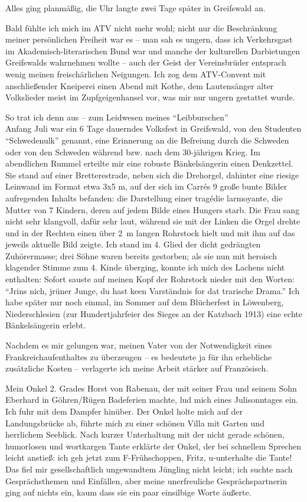 Alles ging planmäßig, die Uhr langte zwei Tage später in Greifswald an.

Bald fühlte ich mich im ATV nicht mehr wohl; nicht nur die Beschränkung meiner persönlichen Freiheit war es -- man sah es ungern, dass ich Verkehrsgast im Akademisch-literarischen Bund war und manche der kulturellen Darbietungen Greifswalds wahrnehmen wollte -- auch der Geist der Vereinsbrüder entsprach wenig meinen freischärlichen Neigungen. Ich zog dem ATV-Convent mit anschließender Kneiperei einen Abend mit Kothe, dem Lautensänger alter Volkslieder meist im Zupfgeigenhansel vor, was mir nur ungern gestattet wurde.

So trat ich denn aus -- zum Leidwesen meines \enquote{Leibburschen}\\

Anfang Juli war ein 6 Tage dauerndes Volksfest in Greifswald, von den Studenten \enquote{Schwedenulk} genannt, eine Erinnerung an die Befreiung durch die Schweden oder von den Schweden während bzw. nach dem 30-jährigen Krieg. Im abendlichen Rummel erteilte mir eine robuste Bänkelsängerin einen Denkzettel. Sie stand auf einer Bretterestrade, neben sich die Drehorgel, dahinter eine riesige Leinwand im Format etwa 3x5 m, auf der sich im Carrés 9 große bunte Bilder aufregenden Inhalts befanden: die Darstellung einer tragédie larmoyante, die Mutter von 7 Kindern, deren auf jedem Bilde eines Hungers starb. Die Frau sang nicht sehr klangvoll, dafür sehr laut, während sie mit der Linken die Orgel drehte und in der Rechten einen über 2~m langen Rohrstock hielt und mit ihm auf das jeweils aktuelle Bild zeigte. Ich stand im 4. Glied der dicht gedrängten Zuhörermasse; drei Söhne waren bereits gestorben; als sie nun mit heroisch klagender Stimme zum 4. Kinde überging, konnte ich mich des Lachens nicht enthalten: Sofort sauste auf meinen Kopf der Rohrstock nieder mit den Worten: \enquote{Jrins nich, jrüner Junge, du hast keen Varständnis for dat trarische Drama.}
Ich habe später nur noch einmal, im Sommer auf dem Blücherfest in Löwenberg, Niederschlesien (zur Hundertjahrfeier des Sieges an der Katzbach 1913) eine echte Bänkelsängerin erlebt.

Nachdem es mir gelungen war, meinen Vater von der Notwendigkeit eines Frankreichaufenthaltes zu überzeugen -- es bedeutete ja für ihn erhebliche zusätzliche Kosten -- verlagerte ich meine Arbeit stärker auf Französisch.

Mein Onkel 2. Grades Horst von Rabenau, der mit seiner Frau und seinem Sohn Eberhard in Göhren/Rügen Badeferien machte, lud mich eines Julisonntages ein. Ich fuhr mit dem Dampfer hinüber. Der Onkel holte mich auf der Landungsbrücke ab, führte mich zu einer schönen Villa mit Garten und herrlichem Seeblick. Nach kurzer Unterhaltung mit der nicht gerade schönen, humorlosen und wortkargen Tante erklärte der Onkel, der bei schnellem Sprechen leicht anstieß: ich geh jetzt zum F-Frühschoppen, Fritz, u-unterhalte die Tante! Das fiel mir gesellschaftlich ungewandtem Jüngling nicht leicht; ich suchte nach Gesprächsthemen und Einfällen, aber meine unerfreuliche Gesprächspartnerin ging auf nichts ein, kaum dass sie ein paar einsilbige Worte äußerte.

